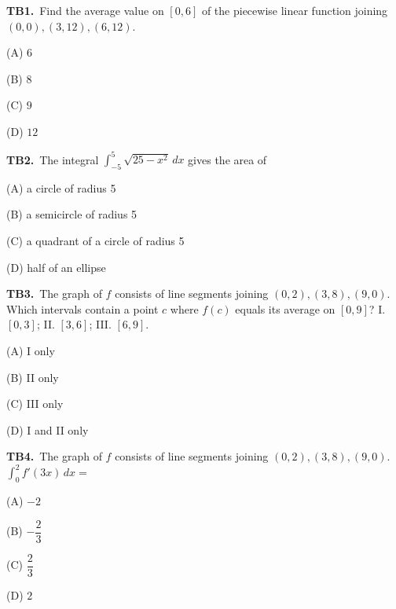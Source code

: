 \documentclass[11pt]{article}
\begin{document}
\bigskip\noindent\textbf{TB1.}\ Find the average value on $[0,6]$ of the piecewise linear function joining $(0,0),(3,12),(6,12)$.
\begin{list}{}{\setlength{\leftmargin}{3em}\setlength{\labelwidth}{2.5em}\setlength{\itemsep}{0pt}\setlength{\topsep}{2pt}}
\item[(A)] $6$
\item[(B)] $8$
\item[(C)] $9$
\item[(D)] $12$
\end{list}

\bigskip\noindent\textbf{TB2.}\ The integral $\displaystyle\int_{-5}^{5} \sqrt{25-x^2}\,dx$ gives the area of
\begin{list}{}{\setlength{\leftmargin}{3em}\setlength{\labelwidth}{2.5em}\setlength{\itemsep}{0pt}\setlength{\topsep}{2pt}}
\item[(A)] a circle of radius 5
\item[(B)] a semicircle of radius 5
\item[(C)] a quadrant of a circle of radius 5
\item[(D)] half of an ellipse
\end{list}

\bigskip\noindent\textbf{TB3.}\ The graph of $f$ consists of line segments joining $(0,2),(3,8),(9,0)$. Which intervals contain a point $c$ where $f(c)$ equals its average on $[0,9]$? I. $[0,3]$; II. $[3,6]$; III. $[6,9]$.
\begin{list}{}{\setlength{\leftmargin}{3em}\setlength{\labelwidth}{2.5em}\setlength{\itemsep}{0pt}\setlength{\topsep}{2pt}}
\item[(A)] I only
\item[(B)] II only
\item[(C)] III only
\item[(D)] I and II only
\end{list}

\bigskip\noindent\textbf{TB4.}\ The graph of $f$ consists of line segments joining $(0,2),(3,8),(9,0)$. $\displaystyle\int_{0}^{2} f'(3x)\,dx =$
\begin{list}{}{\setlength{\leftmargin}{3em}\setlength{\labelwidth}{2.5em}\setlength{\itemsep}{0pt}\setlength{\topsep}{2pt}}
\item[(A)] $-2$
\item[(B)] $-\dfrac{2}{3}$
\item[(C)] $\dfrac{2}{3}$
\item[(D)] $2$
\end{list}
\end{document}
